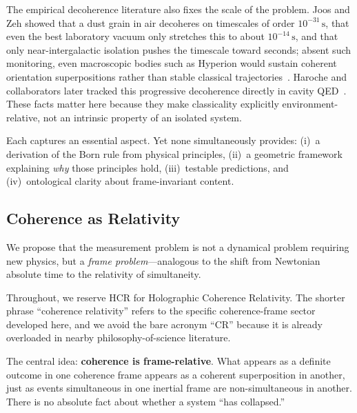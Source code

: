 \documentclass[aps,prd,twocolumn,superscriptaddress,nofootinbib,floatfix]{revtex4-2}
\newcommand{\HCRname}{Holographic Coherence Relativity}
\newcommand{\HCR}{HCR}
\begin{document}
The empirical decoherence literature also fixes the scale of the problem. Joos and Zeh showed that a dust grain in air decoheres on timescales of order $10^{-31}\,\mathrm{s}$, that even the best laboratory vacuum only stretches this to about $10^{-14}\,\mathrm{s}$, and that only near-intergalactic isolation pushes the timescale toward seconds; absent such monitoring, even macroscopic bodies such as Hyperion would sustain coherent orientation superpositions rather than stable classical trajectories~\cite{JoosZeh1985,joosDecoherenceAppearanceClassical2003}. Haroche and collaborators later tracked this progressive decoherence directly in cavity QED~\cite{Haroche1996decoherence,Haroche2012Nobel}. These facts matter here because they make classicality explicitly environment-relative, not an intrinsic property of an isolated system.

Each captures an essential aspect. Yet none simultaneously provides: (i)~a derivation of the Born rule from physical principles, (ii)~a geometric framework explaining \emph{why} those principles hold, (iii)~testable predictions, and (iv)~ontological clarity about frame-invariant content.

\subsection{Coherence as Relativity}

We propose that the measurement problem is not a dynamical problem requiring new physics, but a \emph{frame problem}---analogous to the shift from Newtonian absolute time to the relativity of simultaneity.

Throughout, we reserve \HCR{} for \HCRname{}. The shorter phrase ``coherence relativity'' refers to the specific coherence-frame sector developed here, and we avoid the bare acronym ``CR'' because it is already overloaded in nearby philosophy-of-science literature.

The central idea: \textbf{coherence is frame-relative}. What appears as a definite outcome in one coherence frame appears as a coherent superposition in another, just as events simultaneous in one inertial frame are non-simultaneous in another. There is no absolute fact about whether a system ``has collapsed.''
\end{document}
